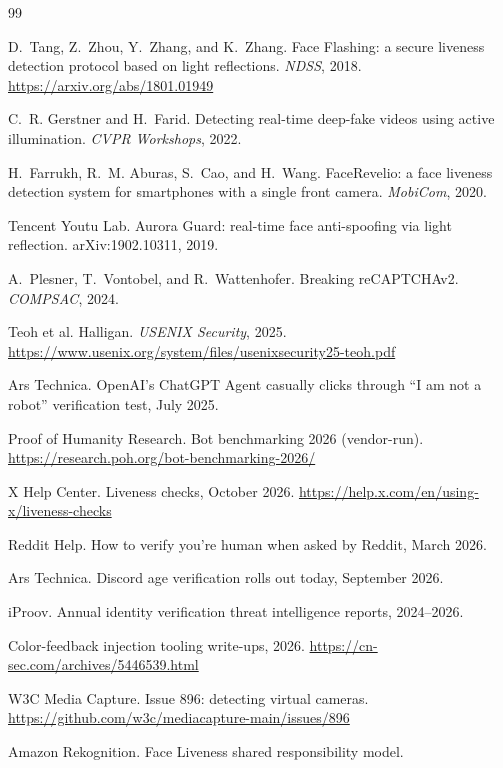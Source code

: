 \documentclass[11pt]{article}
\begin{document}
\begin{thebibliography}{99}
\small

D.~Tang, Z.~Zhou, Y.~Zhang, and K.~Zhang.
Face Flashing: a secure liveness detection protocol based on light reflections.
\emph{NDSS}, 2018. \url{https://arxiv.org/abs/1801.01949}

C.~R. Gerstner and H.~Farid.
Detecting real-time deep-fake videos using active illumination.
\emph{CVPR Workshops}, 2022.

H.~Farrukh, R.~M. Aburas, S.~Cao, and H.~Wang.
FaceRevelio: a face liveness detection system for smartphones with a single front camera.
\emph{MobiCom}, 2020.

Tencent Youtu Lab.
Aurora Guard: real-time face anti-spoofing via light reflection.
arXiv:1902.10311, 2019.

A.~Plesner, T.~Vontobel, and R.~Wattenhofer.
Breaking reCAPTCHAv2.
\emph{COMPSAC}, 2024.

Teoh et al.
Halligan. \emph{USENIX Security}, 2025.
\url{https://www.usenix.org/system/files/usenixsecurity25-teoh.pdf}

Ars Technica.
OpenAI's ChatGPT Agent casually clicks through ``I am not a robot'' verification test, July 2025.

Proof of Humanity Research.
Bot benchmarking 2026 (vendor-run). \url{https://research.poh.org/bot-benchmarking-2026/}

X Help Center. Liveness checks, October 2026. \url{https://help.x.com/en/using-x/liveness-checks}

Reddit Help. How to verify you're human when asked by Reddit, March 2026.

Ars Technica. Discord age verification rolls out today, September 2026.

iProov. Annual identity verification threat intelligence reports, 2024--2026.

Color-feedback injection tooling write-ups, 2026. \url{https://cn-sec.com/archives/5446539.html}

W3C Media Capture. Issue 896: detecting virtual cameras.
\url{https://github.com/w3c/mediacapture-main/issues/896}

Amazon Rekognition. Face Liveness shared responsibility model.


\end{thebibliography}
\end{document}
